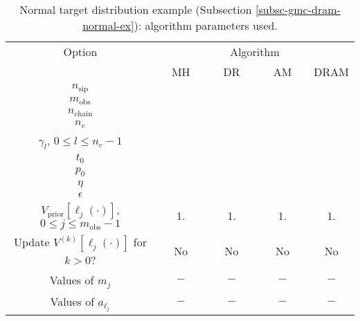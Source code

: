 \begin{table}[h!]
\begin{center}
\begin{tabular}{|c|c|c|c|c|}
\hline
Option                                            & \multicolumn{4}{c|}{Algorithm}                               \\
\cline{2-5}
                                                  & ~~MH~~            & ~~DR~~       & ~~AM~~       & DRAM       \\
\hline
\hline
$n_{\text{sip}}$                                  &                   &              &              &            \\
\hline
$m_{\text{obs}}$                                  &                   &              &              &            \\
\hline
$n_{\text{chain}}$                                &                   &              &              &            \\
\hline
\hline
$n_e$                                             &                   &              &              &            \\
\hline
$\gamma_l$,
$0\leqslant l\leqslant n_e-1$                     &                   &              &              &            \\
\hline
\hline
$t_0$                                             &                   &              &              &            \\
\hline
$p_0$                                             &                   &              &              &            \\
\hline
$\eta$                                            &                   &              &              &            \\
\hline
$\epsilon$                                        &                   &              &              &            \\
\hline
\hline
$V_{\text{prior}}[\ell_j(\cdot)]$,
$0\leqslant j\leqslant m_{\text{obs}}-1$          & 1.                & 1.           & 1.           & 1.         \\
\hline
Update $V^{(k)}[\ell_j(\cdot)]$ for $k>0$?        & No                & No           & No           & No         \\
\hline
Values of $m_j$                                   & $-$               & $-$          & $-$          & $-$        \\
\hline
Values of $a_{\ell_j}$                            & $-$               & $-$          & $-$          & $-$        \\
\hline
\end{tabular}
\caption{Normal target distribution example (Subsection \ref{subsc-gmc-dram-normal-ex}):
algorithm parameters used.
}
\label{tab-dram-normal-ex-alg-params}
\end{center}
\end{table}

